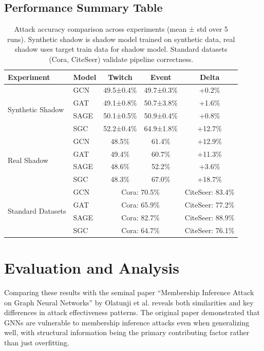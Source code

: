 \documentclass{article}
\begin{document}
\subsection{Performance Summary Table}

\begin{table}[H]
\centering
\caption{Attack accuracy comparison across experiments (mean ± std over 5 runs). Synthetic shadow is shadow model trained on synthetic data, real shadow uses target train data for shadow model. Standard datasets (Cora, CiteSeer) validate pipeline correctness.}
\label{tab:performance}
\begin{tabular}{|l|l|c|c|c|}
\hline
\textbf{Experiment} & \textbf{Model} & \textbf{Twitch} & \textbf{Event} & \textbf{Delta} \\
\hline
\multirow{4}{*}{Synthetic Shadow} & GCN & 49.5±0.4\% & 49.7±0.3\% & +0.2\% \\
 & GAT & 49.1±0.8\% & 50.7±3.8\% & +1.6\% \\
 & SAGE & 50.1±0.5\% & 50.9±0.4\% & +0.8\% \\
 & SGC & 52.2±0.4\% & 64.9±1.8\% & +12.7\% \\
\hline
\multirow{4}{*}{Real Shadow} & GCN & 48.5\% & 61.4\% & +12.9\% \\
 & GAT & 49.4\% & 60.7\% & +11.3\% \\
 & SAGE & 48.6\% & 52.2\% & +3.6\% \\
 & SGC & 48.3\% & 67.0\% & +18.7\% \\
\hline
\multirow{4}{*}{Standard Datasets} & GCN & \multicolumn{2}{c|}{Cora: 70.5\%} & CiteSeer: 83.4\% \\
 & GAT & \multicolumn{2}{c|}{Cora: 65.9\%} & CiteSeer: 77.2\% \\
 & SAGE & \multicolumn{2}{c|}{Cora: 82.7\%} & CiteSeer: 88.9\% \\
 & SGC & \multicolumn{2}{c|}{Cora: 64.7\%} & CiteSeer: 76.1\% \\
\hline
\end{tabular}
\end{table}

\section{Evaluation and Analysis}

Comparing these results with the seminal paper ``Membership Inference Attack on Graph Neural Networks'' by Olatunji et al.\cite{olatunji2021membershipinferenceattackgraph} reveals both similarities and key differences in attack effectiveness patterns. The original paper demonstrated that GNNs are vulnerable to membership inference attacks even when generalizing well, with structural information being the primary contributing factor rather than just overfitting.
\end{document}
